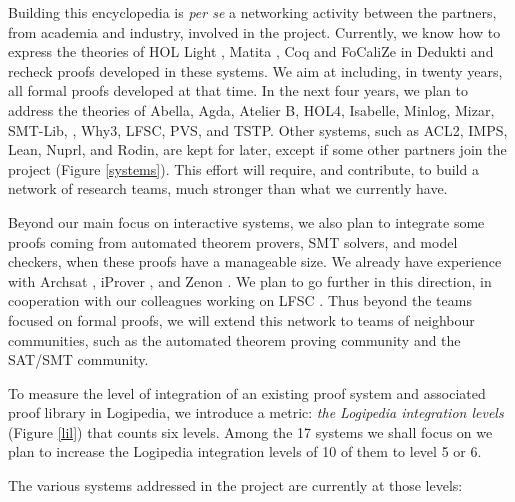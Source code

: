 Building this encyclopedia is {\em per se} a networking activity
between the partners, from academia and industry, involved in the
project.  Currently, we know how to express the theories of {\textsf HOL
  Light} \cite{Assaf12}, {\textsf Matita} \cite{Assaf15}, {\textsf Coq} and
{\textsf FoCaliZe} \cite{Cauderlier16} in {\textsf Dedukti} and recheck proofs
developed in these systems.  We aim at including, in twenty years, all
formal proofs developed at that time.
In the next four years, we plan to address the theories of {\textsf
  Abella}, {\textsf Agda}, {\textsf Atelier B}, {\textsf HOL4}, {\textsf Isabelle},
{\textsf Minlog}, {\textsf Mizar}, {\textsf SMT-Lib}, \tlaplus, {\textsf Why3}, {\textsf
  LFSC}, {\textsf PVS}, and {\textsf TSTP}.  Other systems, such as {\textsf
  ACL2}, {\textsf IMPS}, {\textsf Lean}, {\textsf Nuprl}, and {\textsf Rodin}, are
kept for later, except if some other partners join the project (Figure
\ref{systems}). This effort will require, and contribute, to build a
network of research teams, much stronger than what we currently have.

Beyond our main focus on interactive systems, we also plan to
integrate some proofs coming from automated theorem provers, SMT
solvers, and model checkers, when these proofs have a manageable
size. We already have experience with Archsat \cite{Bury19}, iProver
\cite{Burel10}, and Zenon \cite{CauderlierHalmagrand15}. We plan to go
further in this direction, in cooperation with our colleagues working
on LFSC \cite{Stump09}. Thus beyond the teams focused on formal proofs, we
will extend this network to teams of neighbour communities, such as
the automated theorem proving community and the SAT/SMT community.

To measure the level of integration of an existing proof system and
associated proof library in {\textsf Logipedia}, we introduce a metric:
{\em the {\textsf Logipedia} integration levels} (Figure \ref{lil}) that
counts six levels.  Among the 17 systems we shall focus on we plan to
increase the {\textsf Logipedia} integration levels of 10 of them to level
5 or 6.

The various systems addressed in the project are currently at those levels:

